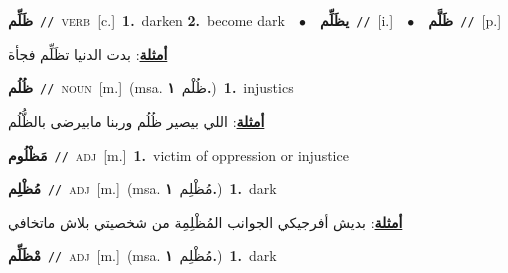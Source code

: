 \documentclass[10pt,a4paper,twoside]{article} %
\begin{document}
\begin{multicols}{2}
{{{{\setlength\topsep{0pt}\textbf{\foreignlanguage{arabic}{ظَلِّم}}\ {\color{gray}\texttt{//}\color{black}}\ \textsc{verb}\ [c.]\ \textbf{1.}~darken  \textbf{2.}~become dark\ \ $\bullet$\ \ \setlength\topsep{0pt}\textbf{\foreignlanguage{arabic}{يظَلِّم}}\ {\color{gray}\texttt{//}\color{black}}\ [i.]\ \ $\bullet$\ \ \setlength\topsep{0pt}\textbf{\foreignlanguage{arabic}{ظَلَّم}}\ {\color{gray}\texttt{//}\color{black}}\ [p.]\  \begin{flushright}\color{gray}\foreignlanguage{arabic}{\textbf{\underline{\foreignlanguage{arabic}{أمثلة}}}: بدت الدنيا تظَلِّم فجأة}\end{flushright}\color{black}} \vspace{2mm}

{\setlength\topsep{0pt}\textbf{\foreignlanguage{arabic}{ظُلُم}}\ {\color{gray}\texttt{//}\color{black}}\ \textsc{noun}\ [m.]\ \color{gray}(msa. \foreignlanguage{arabic}{ظُلْم}~\foreignlanguage{arabic}{\textbf{١.}})\color{black}\ \textbf{1.}~injustics\  \begin{flushright}\color{gray}\foreignlanguage{arabic}{\textbf{\underline{\foreignlanguage{arabic}{أمثلة}}}: اللي بيصير ظُلُم وربنا مابيرضى بالظُّلُم}\end{flushright}\color{black}} \vspace{2mm}

{\setlength\topsep{0pt}\textbf{\foreignlanguage{arabic}{مَظْلُوم}}\ {\color{gray}\texttt{//}\color{black}}\ \textsc{adj}\ [m.]\ \textbf{1.}~victim of oppression or injustice\ 

{\setlength\topsep{0pt}\textbf{\foreignlanguage{arabic}{مُظْلِم}}\ {\color{gray}\texttt{//}\color{black}}\ \textsc{adj}\ [m.]\ \color{gray}(msa. \foreignlanguage{arabic}{مُظْلِم}~\foreignlanguage{arabic}{\textbf{١.}})\color{black}\ \textbf{1.}~dark\  \begin{flushright}\color{gray}\foreignlanguage{arabic}{\textbf{\underline{\foreignlanguage{arabic}{أمثلة}}}: بديش أفرجيكي الجوانب المُظْلِمِة من شخصيتي بلاش ماتخافي}\end{flushright}\color{black}} \vspace{2mm}

{\setlength\topsep{0pt}\textbf{\foreignlanguage{arabic}{مْظَلِّم}}\ {\color{gray}\texttt{//}\color{black}}\ \textsc{adj}\ [m.]\ \color{gray}(msa. \foreignlanguage{arabic}{مُظْلِم}~\foreignlanguage{arabic}{\textbf{١.}})\color{black}\ \textbf{1.}~dark\ 

}}}}}
\end{multicols}
\end{document}
